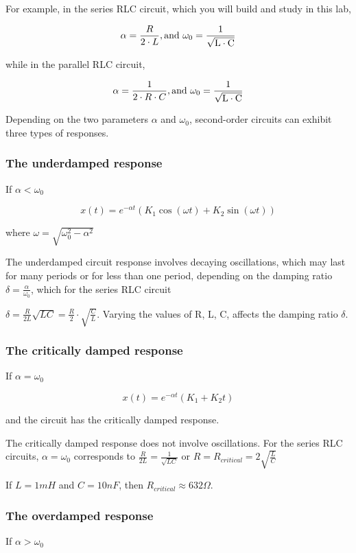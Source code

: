 \documentclass{article}
\begin{document}
For example, in the series RLC circuit, which you will build and study in this lab,

$$\alpha=\frac{R}{2\cdot L},\rm{and}\ \omega_0=\frac{1}{\sqrt{L\cdot C}}$$

while in the parallel RLC circuit,

$$\alpha=\frac{1}{2\cdot R\cdot C},\rm{and}\ \omega_0=\frac{1}{\sqrt{L\cdot C}}$$

Depending on the two parameters $\alpha$ and $\omega_0$, second-order circuits can exhibit three types of responses.

\subsubsection{The underdamped response}

If $\alpha<\omega_0$

$$x(t)=e^{-\alpha t}(K_1\cos(\omega t)+K_2\sin(\omega t))$$

where $\omega=\sqrt{\omega_0^2-\alpha^2}$

The underdamped circuit response involves decaying oscillations, which may last for many periods or for less than one period, depending on the damping ratio $\delta=\frac{\alpha}{\omega_0}$, which for the series RLC circuit 

$\delta=\frac{R}{2L}\sqrt{LC}=\frac{R}{2}\cdot\sqrt{\frac{C}{L}}$. Varying the values of R, L, C, affects the damping ratio $\delta$.

\subsubsection{The critically damped response}

If $\alpha=\omega_0$

$$x(t)=e^{-\alpha t}(K_1+K_2t)$$

and the circuit has the critically damped response.\newline

\indent The critically damped response does not involve oscillations.
\indent For the series RLC circuits, $\alpha=\omega_0$ corresponds to $\frac{R}{2L}=\frac{1}{\sqrt{LC}}$ or $R=R_{critical}=2\sqrt{\frac{L}{C}}$

If $L = 1mH$ and $C = 10nF$, then $R_{critical} \approx 632 \Omega$.

\subsubsection{The overdamped response}
If $\alpha>\omega_0$
\end{document}
